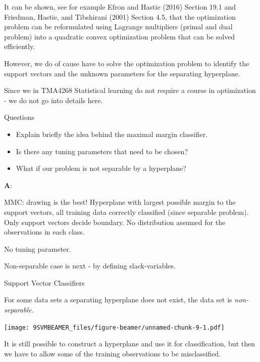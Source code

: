 \documentclass[ignorenonframetext,]{beamer}
\providecommand{\tightlist}{%
  \setlength{\itemsep}{0pt}\setlength{\parskip}{0pt}}
\begin{document}
\begin{frame}

It can be shown, see for example Efron and Hastie (2016) Section 19.1
and Friedman, Hastie, and Tibshirani (2001) Section 4.5, that the
optimization problem can be reformulated using Lagrange multipliers
(primal and dual problem) into a quadratic convex optimization problem
that can be solved efficiently.

However, we do of cause have to solve the optimization problem to
identify the support vectors and the unknown parameters for the
separating hyperplane.

Since we in TMA4268 Statistical learning do not require a course in
optimization - we do not go into details here.

\end{frame}

\begin{frame}

\begin{block}{Questions}

\begin{itemize}
\tightlist
\item
  Explain briefly the idea behind the maximal margin classifier.
\item
  Is there any tuning parameters that need to be chosen?
\item
  What if our problem is not separable by a hyperplane?
\end{itemize}

\end{block}

\end{frame}

\begin{frame}

\textbf{A}:

MMC: drawing is the best! Hyperplane with largest possible margin to the
support vectors, all training data correctly classified (since separable
problem). Only support vectors decide boundary. No distribution assumed
for the observations in each class.

No tuning parameter.

Non-separable case is next - by defining slack-variables.

\end{frame}

\begin{frame}{Support Vector Classifiers}

For some data sets a separating hyperplane does not exist, the data set
is \emph{non-separable}.

\texttt{[image: 9SVMBEAMER\_files/figure-beamer/unnamed-chunk-9-1.pdf]}

It is still possible to construct a hyperplane and use it for
classification, but then we have to allow some of the training
observations to be misclassified.

\end{frame}
\end{document}
